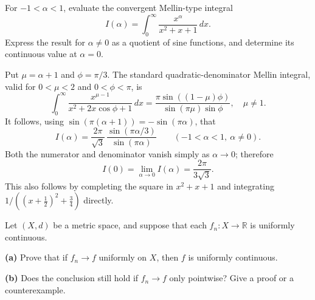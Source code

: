 \begin{problem}[CP-IV-0063]
\label{prob:cp-iv-0063}
For $-1<\alpha<1$, evaluate the convergent Mellin-type integral
\[
I(\alpha)=\int_0^\infty\frac{x^\alpha}{x^2+x+1}\,dx.
\]
Express the result for $\alpha\ne0$ as a quotient of sine functions,
and determine its continuous value at $\alpha=0$.
\end{problem}



\begin{solution}
Put $\mu=\alpha+1$ and $\phi=\pi/3$. The standard quadratic-denominator
Mellin integral, valid for $0<\mu<2$ and $0<\phi<\pi$, is
\[
\int_0^\infty\frac{x^{\mu-1}}{x^2+2x\cos\phi+1}\,dx
=\frac{\pi\sin((1-\mu)\phi)}{\sin(\pi\mu)\sin\phi},
\quad \mu\ne1.
\]
It follows, using $\sin(\pi(\alpha+1))=-\sin(\pi\alpha)$, that
\[
\boxed{I(\alpha)=\frac{2\pi}{\sqrt3}\,
\frac{\sin(\pi\alpha/3)}{\sin(\pi\alpha)}}
\qquad(-1<\alpha<1,\ \alpha\ne0).
\]
Both the numerator and denominator vanish simply as $\alpha\to0$;
therefore
\[
I(0)=\lim_{\alpha\to0}I(\alpha)=\frac{2\pi}{3\sqrt3}.
\]
This also follows by completing the square in $x^2+x+1$ and integrating
$1/((x+\tfrac12)^2+\tfrac34)$ directly.
\end{solution}


\begin{problem}[CP-IV-0064]
\label{prob:cp-iv-0064}
Let $(X,d)$ be a metric space, and suppose that each $f_n:X\to\mathbb R$
is uniformly continuous.

\par\noindent\textbf{(a)} Prove that if $f_n\to f$ uniformly on $X$,
then $f$ is uniformly continuous.

\par\noindent\textbf{(b)} Does the conclusion still hold if $f_n\to f$
only pointwise? Give a proof or a counterexample.
\end{problem}

